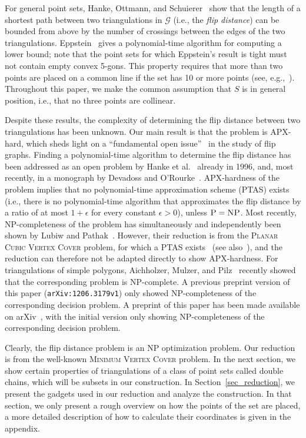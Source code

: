 \documentclass[11pt,a4paper]{article}
\begin{document}
For general point sets, Hanke, Ottmann, and Schuierer~\cite{edge_flipping_distance} show that the length of a shortest path between two triangulations in $\mathcal{G}$ (i.e., the \emph{flip distance}) can be bounded from above by the number of crossings between the edges of the two triangulations.
Eppstein~\cite{eppstein} gives a polynomial-time algorithm for computing a lower bound; note that the point sets for which Eppstein's result is tight must not contain empty convex 5-gons.
This property requires that more than two points are placed on a common line if the set has 10 or more points (see, e.g.,~\cite{empty5gon}).
Throughout this paper, we make the common assumption that $S$ is in general position, i.e., that no three points are collinear.

Despite these results, the complexity of determining the flip distance between two triangulations has been unknown.
Our main result is that the problem is APX-hard, which sheds light on a ``fundamental open issue''~\cite{survey} in the study of flip graphs.
Finding a polynomial-time algorithm to determine the flip distance has been addressed as an open problem by Hanke et al.~\cite{edge_flipping_distance} already in 1996, and, most recently, in a monograph by Devadoss and O'Rourke~\cite[p.~71]{devadoss}.
APX-hardness of the problem implies that no polynomial-time approximation scheme (PTAS) exists (i.e., there is no polynomial-time algorithm that approximates the flip distance by a ratio of at most $1+\epsilon$ for every constant $\epsilon > 0$), unless $\textsc{P}=\textsc{NP}$.
Most recently, NP-completeness of the problem has simultaneously and independently been shown by Lubiw and Pathak~\cite{lubiw}.
However, their reduction is from the \textsc{Planar Cubic Vertex Cover} problem, for which a PTAS exists~\cite{planar_ptas, baker_ptas} (see also~\cite[p.~369]{apx_book}), and the reduction can therefore not be adapted directly to show APX-hardness.
For triangulations of simple polygons, Aichholzer, Mulzer, and Pilz~\cite{poly_hard} recently showed that the corresponding problem is NP-complete.
\ifarxiv
A previous preprint version of this paper ({\tt arXiv:1206.3179v1}) only showed NP-completeness of the corresponding decision problem.
\else
A preprint of this paper has been made available on arXiv~\cite{arxiv_version}, with the initial version only showing NP-completeness of the corresponding decision problem.
\fi

Clearly, the flip distance problem is an NP optimization problem.
Our reduction is from the well-known \textsc{Minimum Vertex Cover} problem.
In the next section, we show certain properties of triangulations of a class of point sets called double chains, which will be subsets in our construction.
In Section~\ref{sec_reduction}, we present the gadgets used in our reduction and analyze the construction.
In that section, we only present a rough overview on how the points of the set are placed, a more detailed description of how to calculate their coordinates is given in the appendix.
\end{document}
